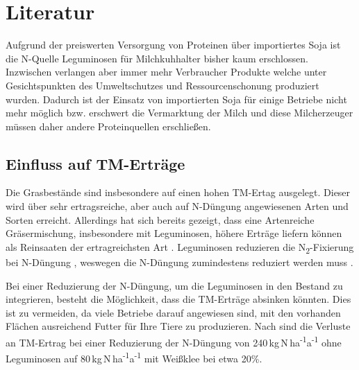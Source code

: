 
\section{Literatur}
\label{sec:Literatur}

Aufgrund der preiswerten Versorgung von Proteinen über importiertes Soja ist die N-Quelle Leguminosen für Milchkuhhalter bisher kaum erschlossen.
Inzwischen verlangen aber immer mehr Verbraucher Produkte welche unter Gesichtspunkten des Umweltschutzes und Ressourcenschonung produziert wurden.
Dadurch ist der Einsatz von importierten Soja für einige Betriebe nicht mehr möglich bzw. erschwert die Vermarktung der Milch und diese Milcherzeuger müssen daher andere Proteinquellen erschließen.

\subsection{Einfluss auf \acl{TM}-Erträge}
\label{subsec:TM}

Die Grasbestände sind insbesondere auf einen hohen \ac{TM}-Ertag ausgelegt.
Dieser wird über sehr ertragsreiche, aber auch auf N-Düngung angewiesenen Arten und Sorten erreicht.
Allerdings hat sich bereits gezeigt, dass eine Artenreiche Gräsermischung, insbesondere mit Leguminosen, höhere Erträge liefern können als Reinsaaten der ertragreichsten Art \parencite{nyfeler2009strong}.
Leguminosen reduzieren die N\textsubscript{2}-Fixierung bei N-Düngung \parencite{ledgard2001nitrogen}, weswegen die N-Düngung zumindestens reduziert werden muss \parencite[34]{weggler2050leguminosen}.

Bei einer Reduzierung der N-Düngung, um die Leguminosen in den Bestand zu integrieren, besteht die Möglichkeit, dass die \ac{TM}-Erträge absinken könnten.
Dies ist zu vermeiden, da viele Betriebe darauf angewiesen sind, mit den vorhanden Flächen ausreichend Futter für Ihre Tiere zu produzieren.
Nach \textcite[11]{engel2013protein} sind die Verluste an \ac{TM}-Ertrag bei einer Reduzierung der N-Düngung von 240\,kg\,N\,ha\textsuperscript{-1}a\textsuperscript{-1} ohne Leguminosen auf 80\,kg\,N\,ha\textsuperscript{-1}a\textsuperscript{-1} mit Weißklee bei etwa 20\%.

